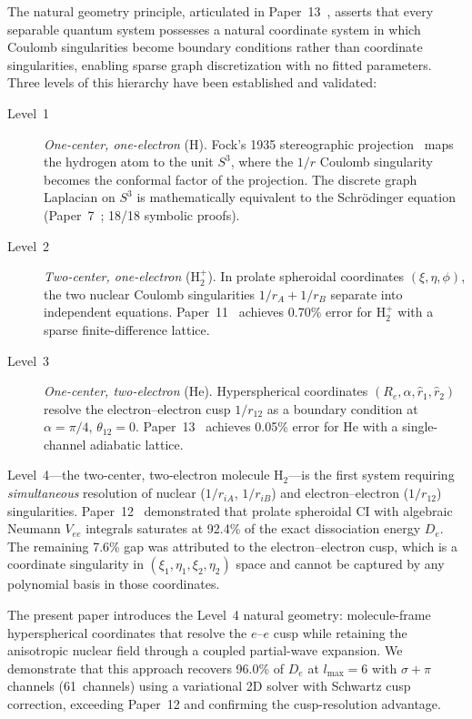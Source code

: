 \documentclass[aps,pra,twocolumn,superscriptaddress,longbibliography]{revtex4-2}
\begin{document}
The natural geometry principle, articulated in Paper~13~\cite{paper13},
asserts that every separable quantum system possesses a natural
coordinate system in which Coulomb singularities become boundary
conditions rather than coordinate singularities, enabling sparse graph
discretization with no fitted parameters.
Three levels of this hierarchy have been established and validated:

\begin{description}
\item[Level~1] \emph{One-center, one-electron} (H).  Fock's 1935
  stereographic projection~\cite{fock1935} maps the hydrogen atom to the
  unit $S^3$, where the $1/r$ Coulomb singularity becomes the conformal
  factor of the projection.  The discrete graph Laplacian on $S^3$ is
  mathematically equivalent to the Schr\"odinger equation
  (Paper~7~\cite{paper7}; 18/18 symbolic proofs).
\item[Level~2] \emph{Two-center, one-electron} (H$_2^+$).  In prolate
  spheroidal coordinates $(\xi,\eta,\phi)$, the two nuclear Coulomb
  singularities $1/r_A + 1/r_B$ separate into independent equations.
  Paper~11~\cite{paper11} achieves 0.70\% error for H$_2^+$ with a
  sparse finite-difference lattice.
\item[Level~3] \emph{One-center, two-electron} (He).  Hyperspherical
  coordinates $(R_e,\alpha,\hat r_1,\hat r_2)$ resolve the
  electron--electron cusp $1/r_{12}$ as a boundary condition at
  $\alpha=\pi/4$, $\theta_{12}=0$.  Paper~13~\cite{paper13} achieves
  0.05\% error for He with a single-channel adiabatic lattice.
\end{description}

Level~4---the two-center, two-electron molecule H$_2$---is the first
system requiring \emph{simultaneous} resolution of nuclear ($1/r_{iA}$,
$1/r_{iB}$) and electron--electron ($1/r_{12}$) singularities.
Paper~12~\cite{paper12} demonstrated that prolate spheroidal CI with
algebraic Neumann $V_{ee}$ integrals saturates at 92.4\% of the exact
dissociation energy $D_e$.  The remaining 7.6\% gap was attributed to the
electron--electron cusp, which is a coordinate singularity in
$(\xi_1,\eta_1,\xi_2,\eta_2)$ space and cannot be captured by any
polynomial basis in those coordinates.

The present paper introduces the Level~4 natural geometry: molecule-frame
hyperspherical coordinates that resolve the $e$--$e$ cusp while retaining
the anisotropic nuclear field through a coupled partial-wave expansion.
We demonstrate that this approach recovers 96.0\% of $D_e$ at
$l_{\max}=6$ with $\sigma{+}\pi$ channels (61~channels) using a
variational 2D solver with Schwartz cusp correction, exceeding
Paper~12 and confirming the cusp-resolution advantage.
\end{document}
